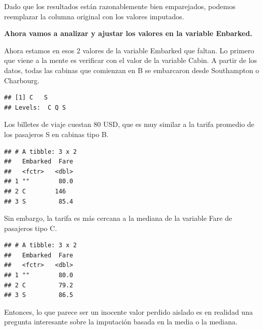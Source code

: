 \documentclass[]{article}
\newenvironment{Shaded}{\begin{snugshade}}{\end{snugshade}}
\newcommand{\KeywordTok}[1]{\textcolor[rgb]{0.13,0.29,0.53}{\textbf{#1}}}
\newcommand{\StringTok}[1]{\textcolor[rgb]{0.31,0.60,0.02}{#1}}
\newcommand{\OperatorTok}[1]{\textcolor[rgb]{0.81,0.36,0.00}{\textbf{#1}}}
\newcommand{\NormalTok}[1]{#1}
\begin{document}
Dado que los resultados están razonablemente bien emparejados, podemos
reemplazar la columna original con los valores imputados.

\begin{Shaded}
\end{Shaded}

\textbf{Ahora vamos a analizar y ajustar los valores en la variable
Enbarked.}

Ahora estamos en esos 2 valores de la variable Embarked que faltan. Lo
primero que viene a la mente es verificar con el valor de la variable
Cabin. A partir de los datos, todas las cabinas que comienzan en B se
embarcaron desde Southampton o Charbourg.

\begin{Shaded}
\end{Shaded}

\begin{verbatim}
## [1] C   S
## Levels:  C Q S
\end{verbatim}

Los billetes de viaje cuestan 80 USD, que es muy similar a la tarifa
promedio de los pasajeros S en cabinas tipo B.

\begin{verbatim}
## # A tibble: 3 x 2
##   Embarked  Fare
##   <fctr>   <dbl>
## 1 ""        80.0
## 2 C        146  
## 3 S         85.4
\end{verbatim}

Sin embargo, la tarifa es más cercana a la mediana de la variable Fare
de pasajeros tipo C.

\begin{verbatim}
## # A tibble: 3 x 2
##   Embarked  Fare
##   <fctr>   <dbl>
## 1 ""        80.0
## 2 C         79.2
## 3 S         86.5
\end{verbatim}

Entonces, lo que parece ser un inocente valor perdido aislado es en
realidad una pregunta interesante sobre la imputación basada en la media
o la mediana.
\end{document}
